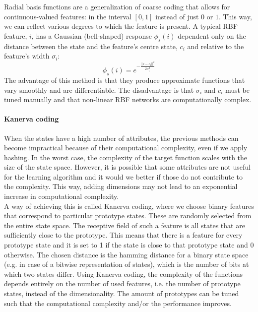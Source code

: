 \documentclass[a4paper]{article}
\begin{document}
Radial basis functions are a generalization of coarse coding that allows for continuous-valued features: in the interval $[0,1]$ instead of just $0$ or $1$. This way, we can reflect various degrees to which the feature is present. A typical RBF feature, $i$, has a Gaussian (bell-shaped) response $\phi_s(i)$ dependent only on the distance between the state and the feature's centre state, $c_i$ and relative to the feature's width $\sigma_i$:
\begin{equation}
\phi_s(i) = e^{-\frac{||s-c_i||^2}{2 \sigma^2_i}}
\end{equation}
The advantage of this method is that they produce approximate functions that vary smoothly and are differentiable. The disadvantage is that $\sigma_i$ and $c_i$ must be tuned manually and that non-linear RBF networks are computationally complex.\\

\paragraph{Kanerva coding}
When the states have a high number of attributes, the previous methods can become impractical because of their computational complexity, even if we apply hashing. In the worst case, the complexity of the target function scales with the size of the state space. However, it is possible that some attributes are not useful for the learning algorithm and it would we better if those do not contribute to the complexity. This way, adding dimensions may not lead to an exponential increase in computational complexity.\\
A way of achieving this is called Kanerva coding, where we choose binary features that correspond to particular prototype states. These are randomly selected from the entire state space. The receptive field of such a feature is all states that are sufficiently close to the prototype. This means that there is a feature for every prototype state and it is set to 1 if the state is close to that prototype state and 0 otherwise. The chosen distance is the hamming distance for a binary state space (e.g. in case of a bitwise representation of states), which is the number of bits at which two states differ. 
Using Kanerva coding, the complexity of the functions depends entirely on the number of used features, i.e. the number of prototype states, instead of the dimensionality. The amount of prototypes can be tuned such that the computational complexity and/or the performance improves.\\
\end{document}
